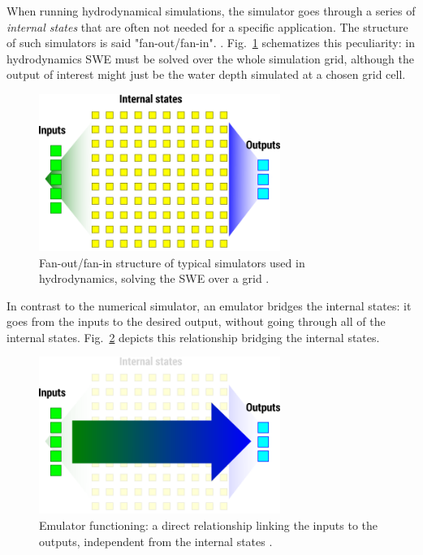 When running hydrodynamical simulations, the simulator goes through a series of \emph{internal states} that are often not needed for a specific application. The structure of such simulators is said "fan-out/fan-in". \autocite{carbajal_emumore_2017}. Fig.~\ref{fig:simulation} schematizes this peculiarity: in hydrodynamics SWE must be solved over the whole simulation grid, although the output of interest might just be the water depth simulated at a chosen grid cell.

\begin{figure}[h]
  \centering
  \includegraphics[width=0.7\textwidth]{Figures/simulation.png}
  \caption{Fan-out/fan-in structure of typical simulators used in hydrodynamics, solving the SWE over a grid \autocite{carbajal_emumore_2017}.}
  \label{fig:simulation}
\end{figure}

In contrast to the numerical simulator, an emulator bridges the internal states: it goes from the inputs to the desired output, without going through all of the internal states.  Fig.~\ref{fig:emulation} depicts this relationship bridging the internal states.

\begin{figure}[h]
  \centering
  \includegraphics[width=0.7\textwidth]{Figures/emulation.png}
  \caption{Emulator functioning: a direct relationship linking the inputs to the outputs, independent from the internal states \autocite{carbajal_emumore_2017}.}
  \label{fig:emulation}
\end{figure}

